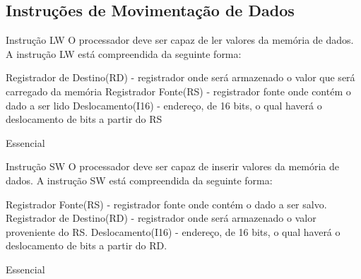 \documentclass{article}
\begin{document}
  \subsection{Instruções de Movimentação de Dados}
    \begin{functional}
     \requirement
      {Instrução LW}
      {O processador deve ser capaz de ler valores da memória de dados.
       A instrução LW está compreendida da seguinte forma:}
       
        { Registrador de Destino(RD) - registrador onde será armazenado o valor que será carregado da memória}
        { Registrador Fonte(RS) - registrador fonte onde contém o dado a ser lido}
        { Deslocamento(I16) - endereço, de 16 bits, o qual haverá o deslocamento de bits a partir do RS}
       
      {Essencial}

     \requirement
      {Instrução SW}
      {O processador deve ser capaz de inserir valores da memória de dados.
      A instrução SW está compreendida da seguinte forma:}
       
        { Registrador Fonte(RS) - registrador fonte onde contém o dado a ser salvo.}
        { Registrador de Destino(RD) - registrador onde será armazenado o valor proveniente do RS.}
        { Deslocamento(I16) - endereço, de 16 bits, o qual haverá o deslocamento de bits a partir do RD.}

      {Essencial}
    \end{functional}
\end{document}
